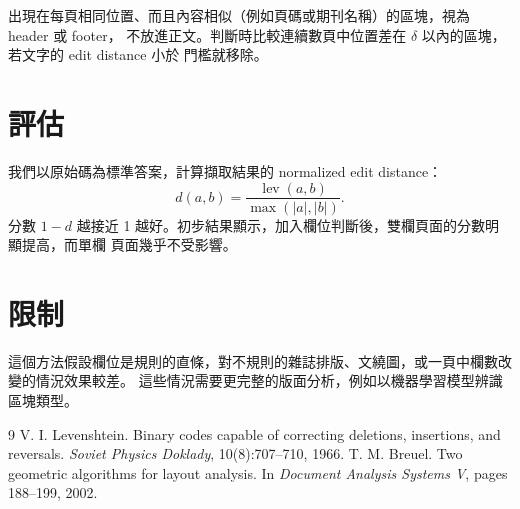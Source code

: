 \documentclass[10pt,twocolumn]{ctexart}
\begin{document}
出現在每頁相同位置、而且內容相似（例如頁碼或期刊名稱）的區塊，視為 header 或 footer，
不放進正文。判斷時比較連續數頁中位置差在 $\delta$ 以內的區塊，若文字的 edit distance 小於
門檻就移除。

\section{評估}

我們以原始碼為標準答案，計算擷取結果的 normalized edit distance：
\begin{equation}
  d(a, b) = \frac{\operatorname{lev}(a, b)}{\max(|a|, |b|)}.
\end{equation}
分數 $1 - d$ 越接近 1 越好。初步結果顯示，加入欄位判斷後，雙欄頁面的分數明顯提高，而單欄
頁面幾乎不受影響。

\section{限制}

這個方法假設欄位是規則的直條，對不規則的雜誌排版、文繞圖，或一頁中欄數改變的情況效果較差。
這些情況需要更完整的版面分析，例如以機器學習模型辨識區塊類型。

\begin{thebibliography}{9}
 V. I. Levenshtein. Binary codes capable of correcting deletions,
  insertions, and reversals. \emph{Soviet Physics Doklady}, 10(8):707--710, 1966.
 T. M. Breuel. Two geometric algorithms for layout analysis.
  In \emph{Document Analysis Systems V}, pages 188--199, 2002.
\end{thebibliography}
\end{document}
